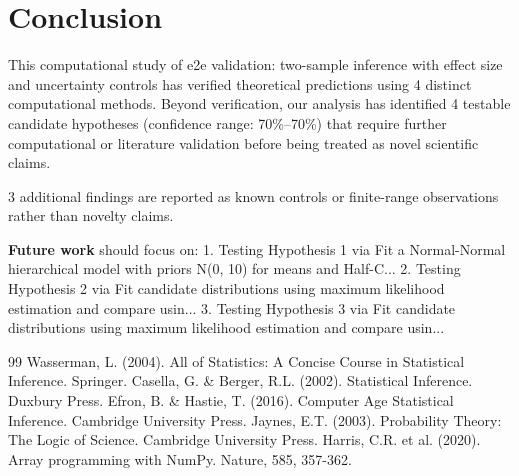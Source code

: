 \documentclass[11pt,a4paper]{article}
\begin{document}
\section{Conclusion}
This computational study of e2e validation: two-sample inference with effect size and uncertainty controls has verified theoretical predictions using 4 distinct computational methods. Beyond verification, our analysis has identified 4 testable candidate hypotheses (confidence range: 70\%–70\%) that require further computational or literature validation before being treated as novel scientific claims.

3 additional findings are reported as known controls or finite-range observations rather than novelty claims.

\textbf{Future work} should focus on:
1. Testing Hypothesis 1 via Fit a Normal-Normal hierarchical model with priors N(0, 10) for means and Half-C...
2. Testing Hypothesis 2 via Fit candidate distributions using maximum likelihood estimation and compare usin...
3. Testing Hypothesis 3 via Fit candidate distributions using maximum likelihood estimation and compare usin...


\begin{thebibliography}{99}
 Wasserman, L. (2004). All of Statistics: A Concise Course in Statistical Inference. Springer.
 Casella, G. \& Berger, R.L. (2002). Statistical Inference. Duxbury Press.
 Efron, B. \& Hastie, T. (2016). Computer Age Statistical Inference. Cambridge University Press.
 Jaynes, E.T. (2003). Probability Theory: The Logic of Science. Cambridge University Press.
 Harris, C.R. et al. (2020). Array programming with NumPy. Nature, 585, 357-362.
\end{thebibliography}
\end{document}
